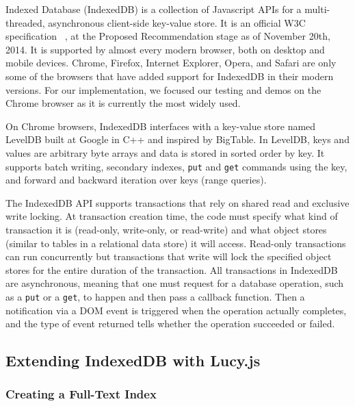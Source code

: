 \documentclass{vldb}
\begin{document}
Indexed Database (IndexedDB) is a collection of Javascript APIs for a multi-threaded, asynchronous client-side key-value store. It is an official W3C specification ~\cite{w3c}, at the Proposed Recommendation stage as of November 20th, 2014. It is supported by almost every modern browser, both on desktop and mobile devices. Chrome, Firefox, Internet Explorer, Opera, and Safari are only some of the browsers that have added support for IndexedDB in their modern versions. For our implementation, we focused our testing and demos on the Chrome browser as it is currently the most widely used.

On Chrome browsers, IndexedDB interfaces with a key-value store named LevelDB built at Google in C++ and inspired by BigTable. In LevelDB, keys and values are arbitrary byte arrays and data is stored in sorted order by key. It supports batch writing, secondary indexes, \texttt{put} and \texttt{get} commands using the key, and forward and backward iteration over keys (range queries). 

The IndexedDB API supports transactions that rely on shared read and exclusive write locking. At transaction creation time, the code must specify what kind of transaction it is (read-only, write-only, or read-write) and what object stores (similar to tables in a relational data store) it will access.  Read-only transactions can run concurrently but transactions that write will lock the specified object stores for the entire duration of the transaction.
All transactions in IndexedDB are asynchronous, meaning that one must request for a database operation, such as a \texttt{put} or a \texttt{get}, to happen and then pass a callback function. Then a notification via a DOM event is triggered when the operation actually completes, and the type of event returned tells whether the operation succeeded or failed.


\subsection{Extending IndexedDB with Lucy.js}

\subsubsection{Creating a Full-Text Index}
\end{document}
